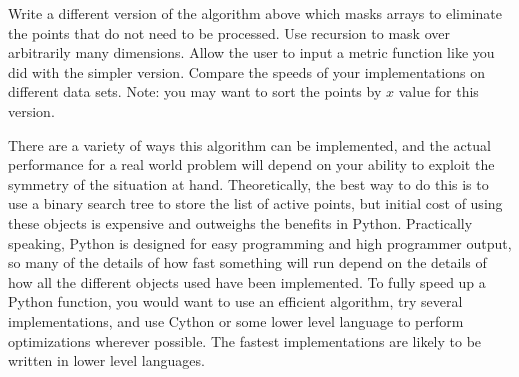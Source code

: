 \begin{problem}
Write a different version of the algorithm above which masks arrays to eliminate the points that do not need to be processed. 
Use recursion to mask over arbitrarily many dimensions. 
Allow the user to input a metric function like you did with the simpler version.
Compare the speeds of your implementations on different data sets.
Note: you may want to sort the points by $x$ value for this version.
\end{problem}

There are a variety of ways this algorithm can be implemented, and the actual performance for a real world problem will depend on your ability to exploit the symmetry of the situation at hand. 
Theoretically, the best way to do this is to use a binary search tree to store the list of active points, but initial cost of using these objects is expensive and outweighs the benefits in Python.
Practically speaking, Python is designed for easy programming and high programmer output, so many of the details of how fast something will run depend on the details of how all the different objects used have been implemented.
To fully speed up a Python function, you would want to use an efficient algorithm, try several implementations, and use Cython or some lower level language to perform optimizations wherever possible. The fastest implementations are likely to be written in lower level languages.